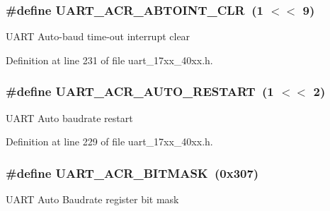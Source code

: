 \subsubsection[{\texorpdfstring{U\+A\+R\+T\+\_\+\+A\+C\+R\+\_\+\+A\+B\+T\+O\+I\+N\+T\+\_\+\+C\+LR}{UART_ACR_ABTOINT_CLR}}]{\setlength{\rightskip}{0pt plus 5cm}\#define U\+A\+R\+T\+\_\+\+A\+C\+R\+\_\+\+A\+B\+T\+O\+I\+N\+T\+\_\+\+C\+LR~(1 $<$$<$ 9)}\hypertarget{group__UART__17XX__40XX_ga2e12222f359d7a5a41668cd729b0731d}{}\label{group__UART__17XX__40XX_ga2e12222f359d7a5a41668cd729b0731d}
U\+A\+RT Auto-\/baud time-\/out interrupt clear 

Definition at line 231 of file uart\+\_\+17xx\+\_\+40xx.\+h.

\subsubsection[{\texorpdfstring{U\+A\+R\+T\+\_\+\+A\+C\+R\+\_\+\+A\+U\+T\+O\+\_\+\+R\+E\+S\+T\+A\+RT}{UART_ACR_AUTO_RESTART}}]{\setlength{\rightskip}{0pt plus 5cm}\#define U\+A\+R\+T\+\_\+\+A\+C\+R\+\_\+\+A\+U\+T\+O\+\_\+\+R\+E\+S\+T\+A\+RT~(1 $<$$<$ 2)}\hypertarget{group__UART__17XX__40XX_ga20674ae8e687d2161ef3fd88f2649036}{}\label{group__UART__17XX__40XX_ga20674ae8e687d2161ef3fd88f2649036}
U\+A\+RT Auto baudrate restart 

Definition at line 229 of file uart\+\_\+17xx\+\_\+40xx.\+h.

\subsubsection[{\texorpdfstring{U\+A\+R\+T\+\_\+\+A\+C\+R\+\_\+\+B\+I\+T\+M\+A\+SK}{UART_ACR_BITMASK}}]{\setlength{\rightskip}{0pt plus 5cm}\#define U\+A\+R\+T\+\_\+\+A\+C\+R\+\_\+\+B\+I\+T\+M\+A\+SK~(0x307)}\hypertarget{group__UART__17XX__40XX_gae83190d58b42771ee951dfe88aada715}{}\label{group__UART__17XX__40XX_gae83190d58b42771ee951dfe88aada715}
U\+A\+RT Auto Baudrate register bit mask 

